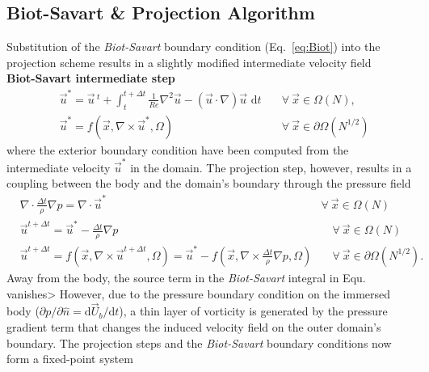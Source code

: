 \documentclass{article}
\begin{document}
\subsection{Biot-Savart \& Projection Algorithm}\label{sec:Biot_projection}
Substitution of the \emph{Biot-Savart} boundary condition (Eq.~\ref{eq:Biot}) into the projection scheme results in a slightly modified intermediate velocity field\\
\textbf{Biot-Savart intermediate step}
\begin{align}
    &\vec{u}^* = \vec{u}\,^t + \int_{t}^{t+\Delta t}\frac{1}{Re}\nabla^2\vec{u} -\left(\vec{u}\cdot\nabla\right)\vec{u}\text{ d}t &\quad\forall\ \vec{x}\in\Omega (N),\\
    &\vec{u}^* = f(\vec{x},\nabla\times \vec{u}^*,\Omega) &\quad\forall\ \vec{x}\in\partial\Omega (N^{1/2})
\end{align}
where the exterior boundary condition have been computed from the intermediate velocity $\vec{u}^*$ in the domain. The projection step, however, results in a coupling between the body and the domain's boundary through the pressure field
\begin{align}
  &\nabla\cdot\frac{\Delta t}{\rho}\nabla p = \nabla\cdot \vec{u}^* &\forall\ \vec{x}\in\Omega (N)\\
  &\vec{u}^{t+\Delta t} = \vec{u}^*-\frac{\Delta t}{\rho}\nabla p &\quad\forall\ \vec{x}\in\Omega (N)\\
  &\vec{u}^{t+\Delta t} = f(\vec{x},\nabla\times \vec{u}^{t+\Delta t},\Omega)= \vec{u}^*-f(\vec{x},\nabla\times\frac{\Delta t}{\rho}\nabla p,\Omega) &\quad\forall\ \vec{x}\in\partial\Omega (N^{1/2}).
\end{align}
Away from the body, the source term in the \emph{Biot-Savart} integral in Equ.~\theequation~ vanishes> However, due to the pressure boundary condition on the immersed body ($\partial p/\partial\hat{n}=\text{d}\vec{U}_b/\text{d}t$), a thin layer of vorticity is generated by the pressure gradient term that changes the induced velocity field on the outer domain's boundary. The projection steps and the \emph{Biot-Savart} boundary conditions now form a fixed-point system
\end{document}
